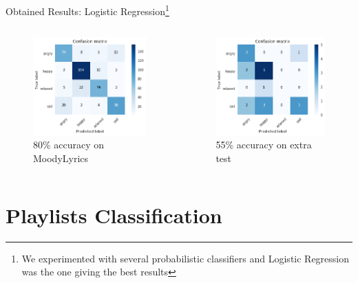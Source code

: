 \documentclass[xcolor=dvipsnames]{beamer}
\begin{document}
\begin{frame}{Obtained Results: Logistic Regression\footnote{We experimented with several probabilistic classifiers and Logistic Regression was the one giving the best results}}
\begin{columns}
\begin{figure}
	\includegraphics[scale=0.5,left]{./images/logreg-ml-cm}
	\caption{80\% accuracy on MoodyLyrics}
\end{figure}

\begin{figure}
	\includegraphics[scale=0.5,left]{./images/logreg-extra-cm}
	\caption{55\% accuracy on extra test}
\end{figure}

\end{columns}
\end{frame}

\section{Playlists Classification}
\end{document}
